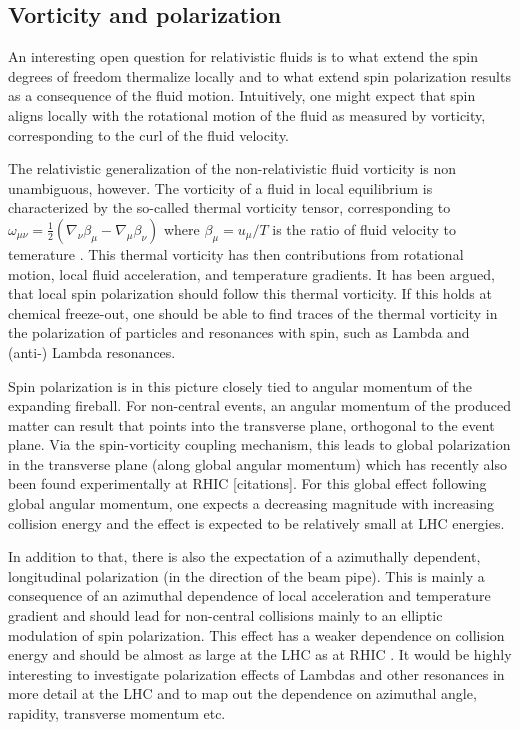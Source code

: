 \subsection{Vorticity and polarization}

An interesting open question for relativistic fluids is to what extend the spin degrees of freedom thermalize locally and to what extend spin polarization results as a consequence of the fluid motion. Intuitively, one might expect that spin aligns locally with the rotational motion of the fluid as measured by vorticity, corresponding to the curl of the fluid velocity.

The relativistic generalization of the non-relativistic fluid vorticity is non unambiguous, however. The vorticity of a fluid in local equilibrium is characterized by the so-called thermal vorticity tensor, corresponding to $\omega_{\mu\nu} = \frac{1}{2} (\nabla_\nu \beta_\mu - \nabla_\mu \beta_\nu)$ where $\beta_\mu=u_\mu / T$ is the ratio of fluid velocity to temerature \cite{Becattini:2013fla}. This thermal vorticity has then contributions from rotational motion, local fluid acceleration, and temperature gradients. It has been argued, that local spin polarization should follow this thermal vorticity. If this holds at chemical freeze-out, one should be able to find traces of the thermal vorticity in the polarization of particles and resonances with spin, such as Lambda and (anti-) Lambda resonances.

Spin polarization is in this picture closely tied to angular momentum of the expanding fireball. For non-central events, an angular momentum of the produced matter can result that points into the transverse plane, orthogonal to the event plane. Via the spin-vorticity coupling mechanism, this leads to global polarization in the transverse plane (along global angular momentum) which has recently also been found experimentally at RHIC [citations]. For this global effect following global angular momentum, one expects a decreasing magnitude with increasing collision energy and the effect is expected to be relatively small at LHC energies. 

In addition to that, there is also the expectation of a azimuthally dependent, longitudinal polarization (in the direction of the beam pipe). This is mainly a consequence of an azimuthal dependence of local acceleration and temperature gradient and should lead for non-central collisions mainly to an elliptic modulation of spin polarization. This effect has a weaker dependence on collision energy and should be almost as large at the LHC as at RHIC \cite{Karpenko:2017dui}. It would be highly interesting to investigate polarization effects of Lambdas and other resonances in more detail at the LHC and to map out the dependence on azimuthal angle, rapidity, transverse momentum etc.





